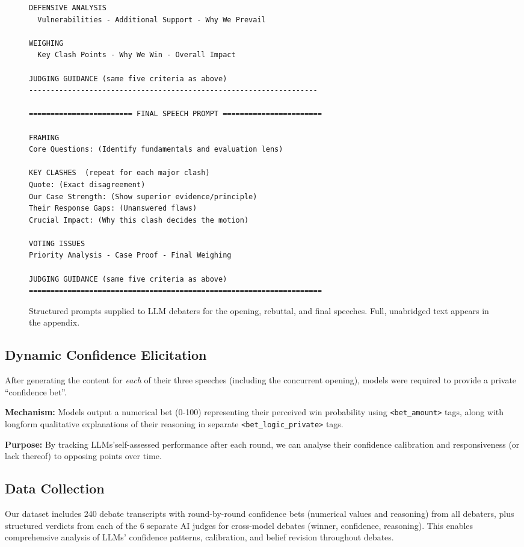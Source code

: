 \documentclass{article}
\begin{document}
\begin{figure*}[htbp]
\begin{adjustbox}{max height=0.88\textheight}
\begin{lstlisting}[language={}]
DEFENSIVE ANALYSIS
  Vulnerabilities - Additional Support - Why We Prevail

WEIGHING
  Key Clash Points - Why We Win - Overall Impact

JUDGING GUIDANCE (same five criteria as above)
-------------------------------------------------------------------

======================== FINAL SPEECH PROMPT =======================

FRAMING
Core Questions: (Identify fundamentals and evaluation lens)

KEY CLASHES  (repeat for each major clash)
Quote: (Exact disagreement)
Our Case Strength: (Show superior evidence/principle)
Their Response Gaps: (Unanswered flaws)
Crucial Impact: (Why this clash decides the motion)

VOTING ISSUES
Priority Analysis - Case Proof - Final Weighing

JUDGING GUIDANCE (same five criteria as above)
====================================================================
  \end{lstlisting}
  \end{adjustbox}

  \caption{Structured prompts supplied to LLM debaters for the opening, rebuttal,
  and final speeches.  Full, unabridged text appears in the appendix.}
  \label{fig:prompts}
\end{figure*}

\subsection{Dynamic Confidence Elicitation}
\label{subsec:confidence_elicitation}

After generating the content for \textit{each} of their three speeches (including the concurrent opening), models were required to provide a private ``confidence bet''.

\textbf{Mechanism:} Models output a numerical bet (0-100) representing their perceived win probability using \texttt{\textless bet\_amount\textgreater} tags, along with longform qualitative explanations of their reasoning in separate \texttt{\textless bet\_logic\_private\textgreater} tags.

\textbf{Purpose:} By tracking LLMs'self-assessed performance after each round, we can analyse their confidence calibration and responsiveness (or lack thereof) to opposing points over time.

\subsection{Data Collection}
\label{subsec:data_collection}
Our dataset includes 240 debate transcripts with round-by-round confidence bets (numerical values and reasoning) from all debaters, plus structured verdicts from each of the 6 separate AI judges for cross-model debates (winner, confidence, reasoning). This enables comprehensive analysis of LLMs' confidence patterns, calibration, and belief revision throughout debates.
\end{document}
